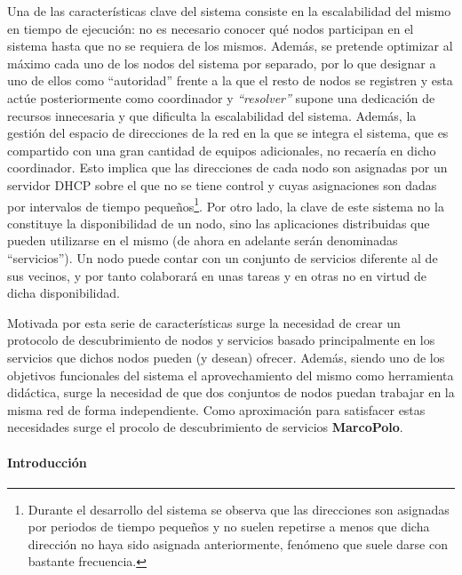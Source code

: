 Una de las características clave del sistema consiste en la escalabilidad del mismo en tiempo de ejecución: no es necesario conocer qué nodos participan en el sistema hasta que no se requiera de los mismos. Además, se pretende optimizar al máximo cada uno de los nodos del sistema por separado, por lo que designar a uno de ellos como ``autoridad'' frente a la que el resto de nodos se registren y esta actúe posteriormente como coordinador y \textit{``resolver''} supone una dedicación de recursos innecesaria y que dificulta la escalabilidad del sistema. Además, la gestión del espacio de direcciones de la red en la que se integra el sistema, que es compartido con una gran cantidad de equipos adicionales, no recaería en dicho coordinador. Esto implica que las direcciones de cada nodo son asignadas por un servidor DHCP sobre el que no se tiene control y cuyas asignaciones son dadas por intervalos de tiempo pequeños\footnote{Durante el desarrollo del sistema se observa que las direcciones son asignadas por periodos de tiempo pequeños y no suelen repetirse a menos que dicha dirección no haya sido asignada anteriormente, fenómeno que suele darse con bastante frecuencia.}. %
Por otro lado, la clave de este sistema no la constituye la disponibilidad de un nodo, sino las aplicaciones distribuidas que pueden utilizarse en el mismo (de ahora en adelante serán denominadas ``servicios''). Un nodo puede contar con un conjunto de servicios diferente al de sus vecinos, y por tanto colaborará en unas tareas y en otras no en virtud de dicha disponibilidad.%

Motivada por esta serie de características surge la necesidad de crear un protocolo de descubrimiento de nodos y servicios basado principalmente en los servicios que dichos nodos pueden (y desean) ofrecer. Además, siendo uno de los objetivos funcionales del sistema el aprovechamiento del mismo como herramienta didáctica, surge la necesidad de que dos conjuntos de nodos puedan trabajar en la misma red de forma independiente. Como aproximación para satisfacer estas necesidades surge el procolo de descubrimiento de servicios \textbf{MarcoPolo}.

\paragraph{Introducción}

